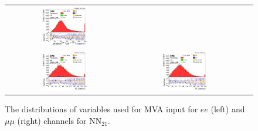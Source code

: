 \begin{figure}[ht]
\begin{center}
\begin{tabular}{ccc}
      \includegraphics[width=0.4\textwidth]{figures/tW/fig/MVA_input/mumu/H_2j1b_M_l1_j2.png}\\
      \includegraphics[width=0.4\textwidth]{figures/tW/fig/MVA_input/ee/H_2j1b_Ptll.png}&
      \includegraphics[width=0.4\textwidth]{figures/tW/fig/MVA_input/mumu/H_2j1b_Ptll.png}\\
    \end{tabular}
    \caption{The distributions of variables used for MVA input for $ee$ (left) and $\mu\mu$ (right) channels for NN$_{21}$.
    \label{fig:MVA_2j1t_2}}
  \end{center}
\end{figure}





